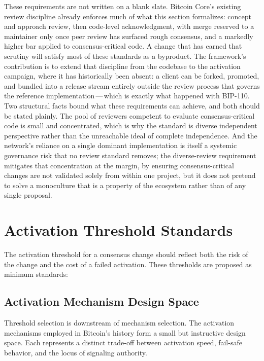 \documentclass[11pt, twoside, openright]{book}
\begin{document}
These requirements are not written on a blank slate. Bitcoin Core's existing review discipline already enforces much of what this section formalizes: concept and approach review, then code-level acknowledgment, with merge reserved to a maintainer only once peer review has surfaced rough consensus, and a markedly higher bar applied to consensus-critical code. A change that has earned that scrutiny will satisfy most of these standards as a byproduct. The framework's contribution is to extend that discipline from the codebase to the activation campaign, where it has historically been absent: a client can be forked, promoted, and bundled into a release stream entirely outside the review process that governs the reference implementation\,---\,which is exactly what happened with BIP-110. Two structural facts bound what these requirements can achieve, and both should be stated plainly. The pool of reviewers competent to evaluate consensus-critical code is small and concentrated, which is why the standard is diverse independent perspective rather than the unreachable ideal of complete independence. And the network's reliance on a single dominant implementation is itself a systemic governance risk that no review standard removes; the diverse-review requirement mitigates that concentration at the margin, by ensuring consensus-critical changes are not validated solely from within one project, but it does not pretend to solve a monoculture that is a property of the ecosystem rather than of any single proposal.

\section{Activation Threshold Standards}

The activation threshold for a consensus change should reflect both the risk of the change and the cost of a failed activation. These thresholds are proposed as minimum standards:

\subsection*{Activation Mechanism Design Space}

Threshold selection is downstream of mechanism selection. The activation mechanisms employed in Bitcoin's history form a small but instructive design space. Each represents a distinct trade-off between activation speed, fail-safe behavior, and the locus of signaling authority.
\end{document}
